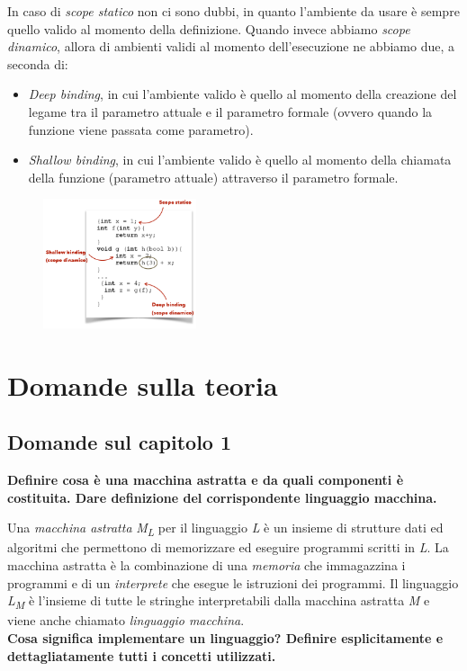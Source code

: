 \documentclass[a4paper,oneside,titlepage]{book}
\begin{document}
In caso di \textit{scope statico} non ci sono dubbi, in quanto l'ambiente da usare è sempre quello valido al momento della definizione. Quando invece abbiamo \textit{scope dinamico}, allora di ambienti validi al momento dell'esecuzione ne abbiamo due, a seconda di: 
\begin{itemize}
	\item \textit{Deep binding}, in cui l'ambiente valido è quello al momento della creazione del legame tra il parametro attuale e il parametro formale (ovvero quando la funzione viene passata come parametro).
	\item \textit{Shallow binding}, in cui l’ambiente valido è quello al momento della chiamata della funzione (parametro attuale) attraverso il parametro formale.
\end{itemize}
\begin{figure}[htp]
	\centering
	\includegraphics[width=0.4\textwidth, height=0.4\textheight, keepaspectratio]{ordSup.png}
\end{figure}


\appendix

\chapter{Domande sulla teoria}

\section{Domande sul capitolo 1}
\textbf{Definire cosa è una macchina astratta e da quali componenti è costituita. Dare definizione del corrispondente linguaggio macchina.}

Una \emph{macchina astratta} \textit{M\textsubscript{L}} per il linguaggio \textit{L} è un insieme di strutture dati ed algoritmi che permettono di memorizzare ed eseguire programmi scritti in \textit{L}. La macchina astratta è la combinazione di una \emph{memoria} che immagazzina i programmi e di un \emph{interprete} che esegue le istruzioni dei programmi. Il linguaggio \textit{L\textsubscript{M}} è l'insieme di tutte le stringhe interpretabili dalla macchina astratta \textit{M} e viene anche chiamato \emph{linguaggio macchina}.
\bigskip
\\
\textbf{Cosa significa implementare un linguaggio? Definire esplicitamente e dettagliatamente tutti i concetti utilizzati.}
\end{document}
